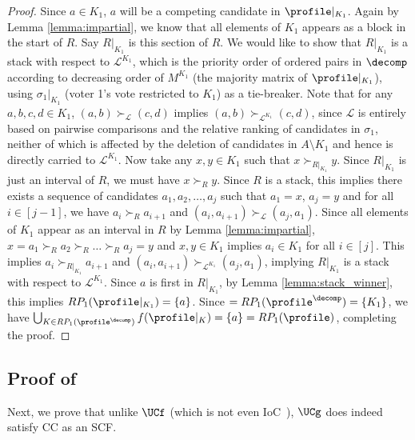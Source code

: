 \begin{proof}
    Since $a\in K_1$, $a$ will be a competing candidate in $\profile|_{K_1}$. Again by Lemma \ref{lemma:impartial}, we know that all elements of $K_1$ appears as a block in the start of $R$. Say $R|_{K_1}$ is this section of $R$. We would like to show that $R|_{K_1}$ is a stack with respect to $\mathcal{L}^{K_1}$, which is the priority order of ordered pairs in $\decomp$ according to decreasing order of $M^{K_1}$ (the majority matrix of $\profile|_{K_1}$), using $\sigma_1|_{K_1}$ (voter 1's vote restricted to $K_1$) as a tie-breaker. Note that for any $a,b,c,d \in K_1$, $(a,b) \succ_\mathcal{L}  (c,d)$ implies $(a,b) \succ_{\mathcal{L}^{K_1}}  (c,d)$, since $\mathcal{L}$ is entirely based on pairwise comparisons and the relative ranking of candidates in $\sigma_1$, neither of which is affected by the deletion of candidates in $A \setminus K_1$ and hence is directly carried to $\mathcal{L}^{K_1}$. Now take any $x,y \in K_1$ such that $x\succ_{R|_{K_1}}y$. Since $R|_{K_1}$ is just an interval of $R$, we must have $x\succ_R y$. Since $R$ is a stack, this implies there exists a sequence of candidates $a_1,a_2, \ldots, a_j$ such that $a_1=x$, $a_j=y$ and for all $i \in [j-1]$, we have $a_i \succ_R a_{i+1}$ and $(a_i,a_{i+1}) \succ_{\mathcal{L}} (a_j , a_1)$. Since all elements of $K_1$ appear as an interval in $R$ by Lemma \ref{lemma:impartial}, $x=a_1 \succ_R a_2 \succ_R \ldots \succ_R a_j = y$ and $x,y\in K_1$ implies $a_i \in K_1$ for all $i \in [j]$. This implies  $a_i \succ_{R|_{K_1}} a_{i+1}$ and $(a_i,a_{i+1}) \succ_{\mathcal{L}^{K_1}} (a_j , a_1)$, implying $R|_{K_1}$ is a stack with respect to $\mathcal{L}^{K_1}$. Since $a$ is first in $R|_{K_1}$, by Lemma \ref{lemma:stack_winner}, this implies $RP_1(\profile|_{K_1})=\{a\}$. Since $ =RP_1(\profile^\decomp)=\{K_1\}$, we have $\bigcup_{K \in RP_1(\profile^\decomp)} f(\profile|_K)=\{a\}=RP_1(\profile)$, completing the proof.
\end{proof}

\subsection{Proof of }

Next, we prove that unlike $\UCf$ (which is not even IoC~\citep{Holliday23:Split}), $\UCg$ does indeed satisfy CC as an SCF.

